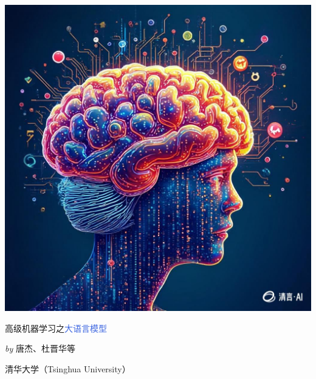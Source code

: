 \begin{titlepage}
	\thispagestyle{empty}
  
  
	\noindent\includegraphics[width=\paperwidth]{figures/title/fig1.png}
  
	{\bfseries{}
		\begin{flushleft}
			\hspace{1cm} 高级机器学习之\textcolor{RoyalBlue}{大语言模型}\par
			\vspace{0.5cm}
		\end{flushleft}
	}
  
	\begin{flushleft}
		\vspace{0.5cm}
		{\Large \hspace{1cm} \textit{by}\; 唐杰、杜晋华等 \par}
		\vspace{0.5cm}
		{\large \hspace{1cm} 清华大学（Tsinghua University）\par}
	\end{flushleft}

  \end{titlepage}